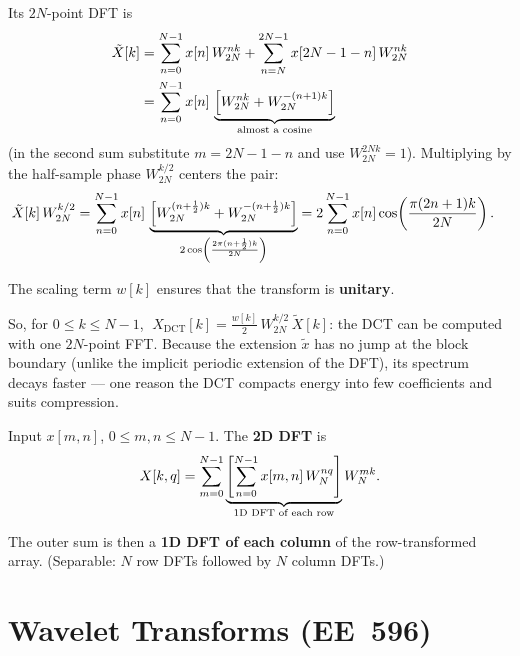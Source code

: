 \documentclass[handout_subfiles_root.tex]{subfiles}
\begin{document}
\noindent Its $2N$-point DFT is
\begin{align*}
\tilde X[k] &= \sum_{n=0}^{N-1} x[n]\,W_{2N}^{nk} + \sum_{n=N}^{2N-1} x[2N-1-n]\,W_{2N}^{nk} \\
&= \sum_{n=0}^{N-1} x[n]\,\underbrace{\Big[W_{2N}^{nk} + W_{2N}^{-(n+1)k}\Big]}_{\HandoutUnderbraceLabel{\text{almost a cosine}}}
\end{align*}
(in the second sum substitute $m=2N-1-n$ and use $W_{2N}^{2Nk}=1$). Multiplying by the half-sample phase $W_{2N}^{k/2}$ centers the pair:
\begin{align*}
\tilde X[k]\,W_{2N}^{k/2} &= \sum_{n=0}^{N-1} x[n]\,\underbrace{\Big[W_{2N}^{(n+\frac12)k} + W_{2N}^{-(n+\frac12)k}\Big]}_{\HandoutUnderbraceLabel{2\cos\left(\frac{2\pi(n+\frac12)k}{2N}\right)}}
= 2\sum_{n=0}^{N-1} x[n]\cos\!\left(\frac{\pi(2n+1)k}{2N}\right).
\end{align*}
\vspace{0.2em}

\noindent The scaling term $w[k]$ ensures that the transform is \textbf{unitary}.

\begin{notebox}[title=\HandoutNoteAddendumTitle]
So, for $0\le k\le N-1$, $\;X_{\mathrm{DCT}}[k] = \tfrac{w[k]}{2}\,W_{2N}^{k/2}\,\tilde X[k]$: the DCT can be computed with one $2N$-point FFT. Because the extension $\tilde x$ has no jump at the block boundary (unlike the implicit periodic extension of the DFT), its spectrum decays faster --- one reason the DCT compacts energy into few coefficients and suits compression.
\end{notebox}


\noindent Input $x[m,n]$, $0\le m,n\le N-1$. The \textbf{2D DFT} is
\begin{equation*}
X[k,q] = \sum_{m=0}^{N-1}\underbrace{\left[\sum_{n=0}^{N-1} x[m,n]\,W_N^{nq}\right]}_{\HandoutUnderbraceLabel{\text{1D DFT of each row}}} W_N^{mk}.
\end{equation*}
\vspace{0.1em}

\noindent The outer sum is then a \textbf{1D DFT of each column} of the row-transformed array. (Separable: $N$ row DFTs followed by $N$ column DFTs.)

\section{Wavelet Transforms (EE~596)}
\end{document}
